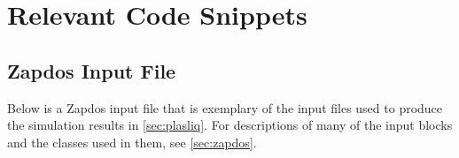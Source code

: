 \makeatletter
\renewcommand{\DOCH}{%
  \settoheight{\py}{\CNoV\thechapter}
  \parskip=0pt plus 1pt %
  \addtolength{\py}{-1pt}
  \CNV\FmN{\@chapapp}\par\nobreak
  \vskip 20\p@
  \setlength{\myhi}{2\baselineskip}
  \setlength{\px}{\myhi}
  \addtolength{\px}{-1\RW}
  \rule[-1\px]{\RW}{\myhi}\mghrulefill{\RW}\rule[-1\px]{\RW}{\myhi}
  \par\nobreak
  \vskip -3\p@%
}
\makeatother

\chapter{Relevant Code Snippets}
\label{chap:code_snippets}

\section{Zapdos Input File}
\label{sec:zap_input}

Below is a Zapdos input file that is exemplary of the input files used to produce the simulation results in \cref{sec:plasliq}. For descriptions of many of the input blocks and the classes used in them, see \cref{sec:zapdos}.

